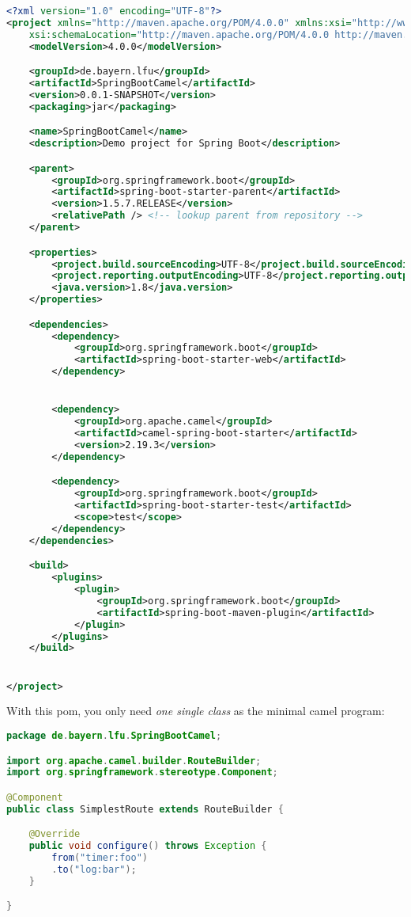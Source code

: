 \begin{lstlisting}[language=xml]
<?xml version="1.0" encoding="UTF-8"?>
<project xmlns="http://maven.apache.org/POM/4.0.0" xmlns:xsi="http://www.w3.org/2001/XMLSchema-instance"
	xsi:schemaLocation="http://maven.apache.org/POM/4.0.0 http://maven.apache.org/xsd/maven-4.0.0.xsd">
	<modelVersion>4.0.0</modelVersion>

	<groupId>de.bayern.lfu</groupId>
	<artifactId>SpringBootCamel</artifactId>
	<version>0.0.1-SNAPSHOT</version>
	<packaging>jar</packaging>

	<name>SpringBootCamel</name>
	<description>Demo project for Spring Boot</description>

	<parent>
		<groupId>org.springframework.boot</groupId>
		<artifactId>spring-boot-starter-parent</artifactId>
		<version>1.5.7.RELEASE</version>
		<relativePath /> <!-- lookup parent from repository -->
	</parent>

	<properties>
		<project.build.sourceEncoding>UTF-8</project.build.sourceEncoding>
		<project.reporting.outputEncoding>UTF-8</project.reporting.outputEncoding>
		<java.version>1.8</java.version>
	</properties>

	<dependencies>
		<dependency>
			<groupId>org.springframework.boot</groupId>
			<artifactId>spring-boot-starter-web</artifactId>
		</dependency>


		<dependency>
			<groupId>org.apache.camel</groupId>
			<artifactId>camel-spring-boot-starter</artifactId>
			<version>2.19.3</version>
		</dependency>

		<dependency>
			<groupId>org.springframework.boot</groupId>
			<artifactId>spring-boot-starter-test</artifactId>
			<scope>test</scope>
		</dependency>
	</dependencies>

	<build>
		<plugins>
			<plugin>
				<groupId>org.springframework.boot</groupId>
				<artifactId>spring-boot-maven-plugin</artifactId>
			</plugin>
		</plugins>
	</build>


</project>
\end{lstlisting}

With this pom, you only need \emph{one single class} as the minimal camel program: 

\begin{lstlisting}[language=java]
package de.bayern.lfu.SpringBootCamel;

import org.apache.camel.builder.RouteBuilder;
import org.springframework.stereotype.Component;

@Component
public class SimplestRoute extends RouteBuilder {

	@Override
	public void configure() throws Exception {
		from("timer:foo")
		.to("log:bar");
	}

}
\end{lstlisting}


